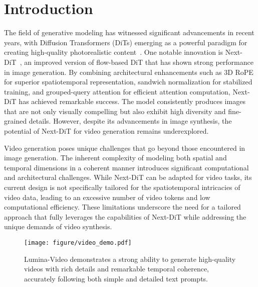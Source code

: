 \section{Introduction}
\label{sec:intro}

The field of generative modeling has witnessed significant advancements in recent years, with Diffusion Transformers (DiTs) emerging as a powerful paradigm for creating high-quality photorealistic content~\citep{DiT,sd3,openai2024sora}. 
One notable innovation is Next-DiT~\citep{luminanext}, an improved version of flow-based DiT that has shown strong performance in image generation.
By combining architectural enhancements such as 3D RoPE for superior spatiotemporal representation, sandwich normalization for stabilized training, and grouped-query attention for efficient attention computation, Next-DiT has achieved remarkable success. The model consistently produces images that are not only visually compelling but also exhibit high diversity and fine-grained details. 
However, despite its advancements in image synthesis, the potential of Next-DiT for video generation remains underexplored. 

Video generation poses unique challenges that go beyond those encountered in image generation. The inherent complexity of modeling both spatial and temporal dimensions in a coherent manner introduces significant computational and architectural challenges. While Next-DiT can be adapted for video tasks, its current design is not specifically tailored for the spatiotemporal intricacies of video data, leading to an excessive number of video tokens and low computational efficiency. 
These limitations underscore the need for a tailored approach that fully leverages the capabilities of Next-DiT while addressing the unique demands of video synthesis.

\begin{figure*}[t]
    \centering
    \texttt{[image: figure/video\_demo.pdf]}
    \vspace{-1.5em}
    \caption{Lumina-Video demonstrates a strong ability to generate high-quality videos with rich details and remarkable temporal coherence, accurately following both simple and detailed text prompts.}
    \label{fig:demos}
\end{figure*}

